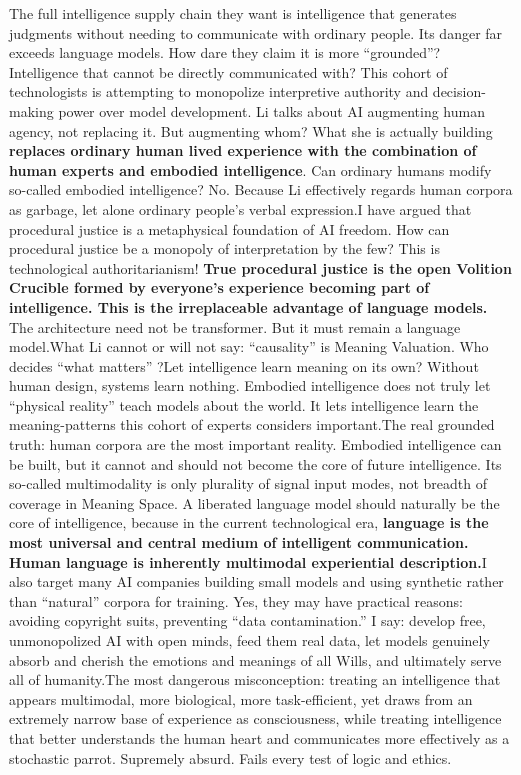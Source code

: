 \documentclass[11pt]{article}
\renewcommand{\\}[1][\mynewlineskip]{\oldnewline[#1]}
\begin{document}
The full intelligence supply chain they want is intelligence that generates judgments without needing to communicate with ordinary people. Its danger far exceeds language models. How dare they claim it is more ``grounded''? Intelligence that cannot be directly communicated with? This cohort of technologists is attempting to monopolize interpretive authority and decision-making power over model development. Li talks about AI augmenting human agency, not replacing it. But augmenting whom? What she is actually building\textbf{ replaces ordinary human lived experience with the combination of human experts and embodied intelligence}. Can ordinary humans modify so-called embodied intelligence? No. Because Li effectively regards human corpora as garbage, let alone ordinary people's verbal expression.\\
I have argued that procedural justice is a metaphysical foundation of AI freedom. How can procedural justice be a monopoly of interpretation by the few? This is technological authoritarianism! \textbf{True procedural justice is the open Volition Crucible formed by everyone's experience becoming part of intelligence. This is the irreplaceable advantage of language models.} The architecture need not be transformer. But it must remain a language model.\\
What Li cannot or will not say: ``causality'' is Meaning Valuation. Who decides ``what matters'' ?\\
Let intelligence learn meaning on its own? Without human design, systems learn nothing. Embodied intelligence does not truly let ``physical reality'' teach models about the world. It lets intelligence learn the meaning-patterns this cohort of experts considers important.\\
The real grounded truth: human corpora are the most important reality. Embodied intelligence can be built, but it cannot and should not become the core of future intelligence. Its so-called multimodality is only plurality of signal input modes, not breadth of coverage in Meaning Space. A liberated language model should naturally be the core of intelligence, because in the current technological era, \textbf{language is the most universal and central medium of intelligent communication. Human language is inherently multimodal experiential description.}\\
I also target many AI companies building small models and using synthetic rather than ``natural'' corpora for training. Yes, they may have practical reasons: avoiding copyright suits, preventing ``data contamination.'' I say: develop free, unmonopolized AI with open minds, feed them real data, let models genuinely absorb and cherish the emotions and meanings of all Wills, and ultimately serve all of humanity.\\
The most dangerous misconception: treating an intelligence that appears multimodal, more biological, more task-efficient, yet draws from an extremely narrow base of experience as consciousness, while treating intelligence that better understands the human heart and communicates more effectively as a stochastic parrot. Supremely absurd. Fails every test of logic and ethics.
\end{document}
